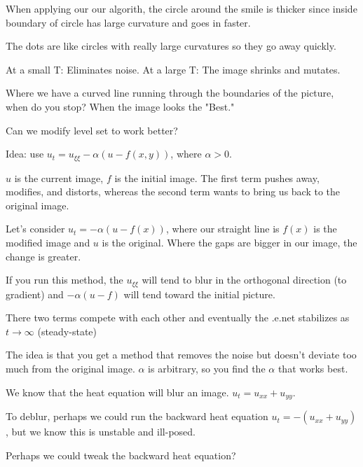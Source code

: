 \documentclass{article}
\begin{document}
When applying our our algorith, the circle around the smile is thicker since inside boundary of circle has large curvature and goes in faster.

The dots are like circles with really large curvatures so they go away quickly.

At a small T: Eliminates noise.
At a large T: The image shrinks and mutates.



Where we have a curved line running through the boundaries of the picture, when do you stop? When the image looks the "Best."

Can we modify level set to work better?

Idea: use $u_t = u_{\xi\xi} - \alpha(u - f(x, y))$, where $\alpha > 0$.

$u$ is the current image, $f$ is the initial image. The first term pushes away, modifies, and distorts, whereas the second term wants to bring us back to the original image.

Let's consider $u_t = - \alpha(u - f(x))$, where our straight line is $f(x)$ is the modified image and $u$ is the original. Where the gaps are bigger in our image, the change is greater.

If you run this method, the $u_{\xi\xi}$ will tend to blur in the orthogonal direction (to gradient) and $-\alpha(u - f)$ will tend toward the initial picture.

There two terms compete with each other and eventually the .e.net stabilizes as $t \to \infty$ (steady-state)

The idea is that you get a method that removes the noise but doesn't deviate too much from the original image. $\alpha$ is arbitrary, so you find the $\alpha$ that works best.


We know that the heat equation will blur an image. $u_t = u_{xx} + u_{yy}$.

To deblur, perhaps we could run the backward heat equation $u_t = -(u_{xx} + u_{yy})$, but we know this is unstable and ill-posed.

Perhaps we could tweak the backward heat equation?
\end{document}

